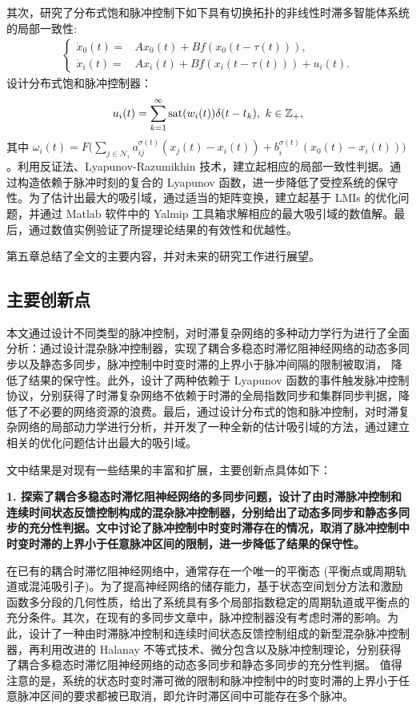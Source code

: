 其次，研究了分布式饱和脉冲控制下如下具有切换拓扑的非线性时滞多智能体系统的局部一致性:
\begin{align*} 
\left\{\begin{aligned} 
\dot{x}_0(t)=&Ax_0(t)+Bf(x_0(t-\tau(t))),\\
\dot{x}_i(t)=&Ax_i(t)+Bf(x_i(t-\tau(t)))+u_i(t).
\end{aligned}\right.
\end{align*}
设计分布式饱和脉冲控制器：
\begin{align*} 
u_i(t)=\sum\limits_{k=1}^{\infty}{\rm sat}(w_i(t)) \delta (t-t_k),\ k\in\mathbb{Z}_+,
\end{align*}
其中 $
\omega_i(t)=F\big(\sum\limits_{j\in \mathcal{N}_i}a^{\sigma(t)}_{ij}(x_j(t)-x_i(t))+b^{\sigma(t)}_i(x_0(t)-x_i(t))\big) 
$。利用反证法、Lyapunov-Razumikhin 技术，建立起相应的局部一致性判据。通过构造依赖于脉冲时刻的复合的 Lyapunov 函数，进一步降低了受控系统的保守性。为了估计出最大的吸引域，通过适当的矩阵变换，建立起基于 LMIs 的优化问题，并通过 Matlab 软件中的 Yalmip 工具箱求解相应的最大吸引域的数值解。最后，通过数值实例验证了所提理论结果的有效性和优越性。
 
第五章总结了全文的主要内容，并对未来的研究工作进行展望。


\subsection{主要创新点}
本文通过设计不同类型的脉冲控制，对时滞复杂网络的多种动力学行为进行了全面分析：通过设计混杂脉冲控制器，实现了耦合多稳态时滞忆阻神经网络的动态多同步以及静态多同步，脉冲控制中时变时滞的上界小于脉冲间隔的限制被取消， 降低了结果的保守性。此外，设计了两种依赖于 Lyapunov 函数的事件触发脉冲控制协议，分别获得了时滞复杂网络不依赖于时滞的全局指数同步和集群同步判据，降低了不必要的网络资源的浪费。最后，通过设计分布式的饱和脉冲控制，对时滞复杂网络的局部动力学进行分析，并开发了一种全新的估计吸引域的方法，通过建立相关的优化问题估计出最大的吸引域。

文中结果是对现有一些结果的丰富和扩展，主要创新点具体如下：

\textbf{1. 探索了耦合多稳态时滞忆阻神经网络的多同步问题，设计了由时滞脉冲控制和连续时间状态反馈控制构成的混杂脉冲控制器，分别给出了动态多同步和静态多同步的充分性判据。文中讨论了脉冲控制中时变时滞存在的情况，取消了脉冲控制中时变时滞的上界小于任意脉冲区间的限制，进一步降低了结果的保守性。}

在已有的耦合时滞忆阻神经网络中，通常存在一个唯一的平衡态 (平衡点或周期轨道或混沌吸引子)。为了提高神经网络的储存能力，基于状态空间划分方法和激励函数多分段的几何性质，给出了系统具有多个局部指数稳定的周期轨道或平衡点的充分条件。其次，在现有的多同步文章中，脉冲控制器没有考虑时滞的影响。为此，设计了一种由时滞脉冲控制和连续时间状态反馈控制组成的新型混杂脉冲控制器，再利用改进的 Halanay 不等式技术、微分包含以及脉冲控制理论，分别获得了耦合多稳态时滞忆阻神经网络的动态多同步和静态多同步的充分性判据。 值得注意的是，系统的状态时变时滞可微的限制和脉冲控制中的时变时滞的上界小于任意脉冲区间的要求都被已取消，即允许时滞区间中可能存在多个脉冲。

